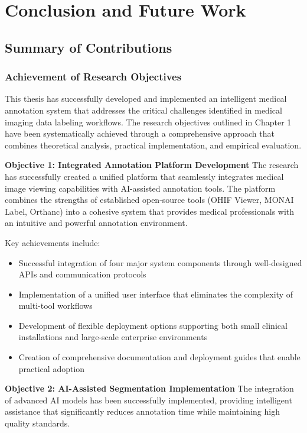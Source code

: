 \chapter{Conclusion and Future Work}

\section{Summary of Contributions}

\subsection{Achievement of Research Objectives}

This thesis has successfully developed and implemented an intelligent medical annotation system that addresses the critical challenges identified in medical imaging data labeling workflows. The research objectives outlined in Chapter 1 have been systematically achieved through a comprehensive approach that combines theoretical analysis, practical implementation, and empirical evaluation.

\textbf{Objective 1: Integrated Annotation Platform Development}
The research has successfully created a unified platform that seamlessly integrates medical image viewing capabilities with AI-assisted annotation tools. The platform combines the strengths of established open-source tools (OHIF Viewer, MONAI Label, Orthanc) into a cohesive system that provides medical professionals with an intuitive and powerful annotation environment.

Key achievements include:
\begin{itemize}
    \item Successful integration of four major system components through well-designed APIs and communication protocols
    \item Implementation of a unified user interface that eliminates the complexity of multi-tool workflows
    \item Development of flexible deployment options supporting both small clinical installations and large-scale enterprise environments
    \item Creation of comprehensive documentation and deployment guides that enable practical adoption
\end{itemize}

\textbf{Objective 2: AI-Assisted Segmentation Implementation}
The integration of advanced AI models has been successfully implemented, providing intelligent assistance that significantly reduces annotation time while maintaining high quality standards.

